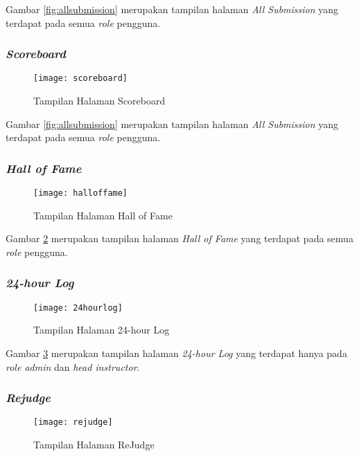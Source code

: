 Gambar \ref{fig:allsubmission} merupakan tampilan halaman \textit{All Submission} yang terdapat pada semua \textit{role} pengguna.

\subsubsection{\textit{Scoreboard}}
\begin{figure}[H]
	\centering  
	\texttt{[image: scoreboard]}  
	\caption[Tampilan Halaman \textit{Scoreboard}]{Tampilan Halaman Scoreboard} 
	\label{fig:scoreboard} 
\end{figure}

Gambar \ref{fig:allsubmission} merupakan tampilan halaman \textit{All Submission} yang terdapat pada semua \textit{role} pengguna.

\subsubsection{\textit{Hall of Fame}}
\begin{figure}[H]
	\centering  
	\texttt{[image: halloffame]}  
	\caption[Tampilan Halaman \textit{Hall of Fame}]{Tampilan Halaman Hall of Fame} 
	\label{fig:halloffame} 
\end{figure}

Gambar \ref{fig:halloffame} merupakan tampilan halaman \textit{Hall of Fame} yang terdapat pada semua \textit{role} pengguna.


\subsubsection{\textit{24-hour Log}}
\begin{figure}[H]
	\centering  
	\texttt{[image: 24hourlog]}  
	\caption[Tampilan Halaman \textit{24-hour Log}]{Tampilan Halaman 24-hour Log} 
	\label{fig:24hourlog} 
\end{figure}

Gambar \ref{fig:24hourlog} merupakan tampilan halaman \textit{24-hour Log} yang terdapat hanya pada \textit{role admin} dan \textit{head instructor}.

\subsubsection{\textit{Rejudge}}
\begin{figure}[H]
	\centering  
	\texttt{[image: rejudge]}  
	\caption[Tampilan Halaman \textit{ReJudge}]{Tampilan Halaman ReJudge} 
	\label{fig:rejudge} 
\end{figure}

